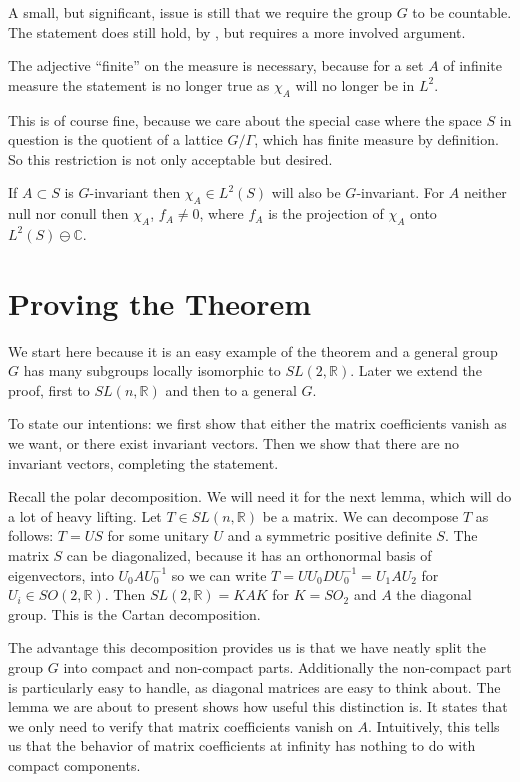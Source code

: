 \documentclass[
  12pt
]{article}
\numberwithin{equation}{section}
\theoremstyle{plain}
\newcommand{\G}{\ensuremath{G}\xspace}
\newcommand{\slnr}{\ensuremath{SL(n, \mathbb{R})}\xspace}
\begin{document}
  A small, but significant, issue is still that we require the group \G to be countable.
  The statement does still hold, by \cite[Lemma 2.2.16]{Zimmer84}, but requires a more involved argument.

  The adjective ``finite'' on the measure is necessary, because for a set
  $A$ of infinite measure the statement is no longer true as $\chi_A$
  will no longer be in $L^2$.

  This is of course fine, because we care about the special case where the
  space $S$ in question is the quotient of a lattice $G/\Gamma$, which has
  finite measure by definition. So this restriction is not only acceptable but
  desired.

  If $A\subset S$ is $G$-invariant then $\chi_A\in L^2(S)$ will also
  be $G$-invariant. 
  For $A$ neither null nor conull then
  $\chi_A$, $f_A \neq 0$, where $f_A$ is the projection of
  $\chi_A$ onto $L^2(S) \ominus \mathbb{C}$.




\hypertarget{proof-for-sl2r}{%
\section{Proving the Theorem}\label{proof-for-sl2r}}


  We start here because it is an easy example of the theorem and a general
  group $G$ has many subgroups locally isomorphic to
  $SL(2, \mathbb{R})$. Later we extend the proof, first to
  $SL(n, \mathbb{R})$ and then to a general $G$.

  To state our intentions: we first show that either the matrix
  coefficients vanish as we want, or there exist invariant vectors. Then
  we show that there are no invariant vectors, completing the statement.

  Recall the polar decomposition. We will need it for the next lemma, which will do a lot of heavy lifting.
  Let $T \in \slnr$ be a matrix. We can decompose $T$ as follows:
  $T = US$ for some unitary $U$ and a symmetric positive definite $S$. The matrix $S$ can be
  diagonalized, because it has an orthonormal basis of eigenvectors, into $U_0 A U_0^{-1}$ so we can write
  $T = U U_0 D U_0^{-1} = U_1 A U_2$ for $U_i \in SO(2, \mathbb{R})$.
  Then $SL(2, \mathbb{R}) = KAK$ for $K = SO_2$ and $A$ the diagonal
  group. This is the Cartan decomposition.

  The advantage this decomposition provides us is that we have neatly split the group $G$ into compact and non-compact parts.
  Additionally the non-compact part is particularly easy to handle, as diagonal matrices are easy to think about.
  The lemma we are about to present shows how useful this distinction is. It states that we only need to verify that matrix coefficients vanish on $A$.
  Intuitively, this tells us that the behavior of matrix coefficients at infinity has nothing to do with compact components.
\end{document}
